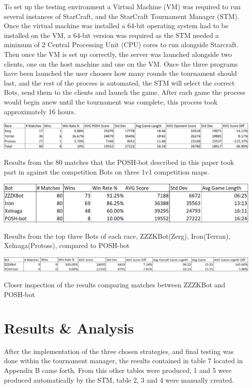 \documentclass[journal]{IEEEtran}
\begin{document}
	To set up the testing environment a Virtual Machine (VM) was required to run several instances of StarCraft, and the StarCraft Tournament Manager (STM). Once the virtual machine was installed a 64-bit operating system had to be installed on the VM, a 64-bit version was required as the STM needed a minimum of 2 Central Processing Unit (CPU) cores to run alongside Starcraft. Then once the VM is set up correctly, the server was launched alongside two clients, one on the host machine and one on the VM. Once the three programs have been launched the user chooses how many rounds the tournament should last, and the rest of the process is automated, the STM will select the correct Bots, send them to the clients and launch the game. After each game the process would begin anew until the tournament was complete, this process took approximately 16 hours. 
	\begin{table}[]
		\centering
		\includegraphics[width=\textwidth]{POSH-botWin}
		\caption{Results from the 80 matches that the POSH-bot described in this paper took part in against the competition Bots on three 1v1 competition maps.}
		\label{Table3}
		\centering
		\includegraphics[width=\textwidth]{TopThreeWin}
		\caption{Results from the top three Bots of each race, ZZZKBot(Zerg), Iron(Terran), Xelnaga(Protoss), compared to POSH-bot}
		\label{Table4}
		\centering
		\includegraphics[width=\textwidth]{PvsZ}
		\caption{Closer inspection of the results comparing matches between ZZZKBot and POSH-bot}
		\label{Table5}
	\end{table}
	
	\section{Results \& Analysis}
	After the implementation of the three chosen strategies, and final testing was done within the tournament manager, the results contained in table 7 located in Appendix B came forth. From this other tables were produced, 1 and 5 were produced automatically by the STM, table 2, 3 and 4 were manually created. 
		
\end{document}
